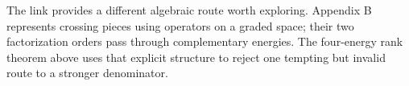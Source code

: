 The link provides a different algebraic route worth exploring.
Appendix B represents crossing pieces using operators on a graded space;
their two factorization orders pass through complementary energies.
The four-energy rank theorem above uses that explicit structure to reject
one tempting but invalid route to a stronger denominator.
